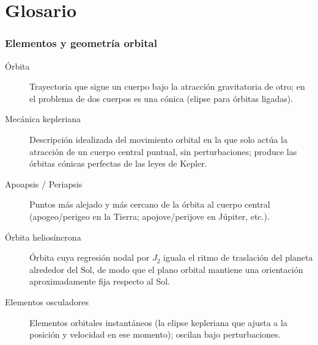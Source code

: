 \chapter*{Glosario}
\label{ch:Glosario}

\subsection*{Elementos y geometría orbital}
\begin{description}
  \item[Órbita] Trayectoria que sigue un cuerpo bajo la atracción gravitatoria de otro; en el problema de dos cuerpos es una cónica (elipse para órbitas ligadas).
  \item[Mecánica kepleriana] Descripción idealizada del movimiento orbital en la que solo actúa la atracción de un cuerpo central puntual, sin perturbaciones; produce las órbitas cónicas perfectas de las leyes de Kepler.
  \item[Apoapsis / Periapsis] Puntos más alejado y más cercano de la órbita al cuerpo central (apogeo/perigeo en la Tierra; apojove/perijove en Júpiter, etc.).
  \item[Órbita heliosíncrona] Órbita cuya regresión nodal por $J_2$ iguala el ritmo de traslación del planeta alrededor del Sol, de modo que el plano orbital mantiene una orientación aproximadamente fija respecto al Sol.
  \item[Elementos osculadores] Elementos orbitales instantáneos (la elipse kepleriana que ajusta a la posición y velocidad en ese momento); oscilan bajo perturbaciones.
\end{description}

